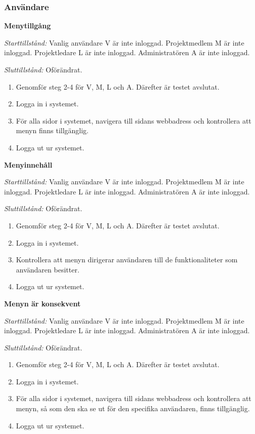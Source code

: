 \documentclass[a4paper]{article}
\begin{document}
\subsubsection{Användare}
\begin{FT}
\item \textbf{Menytillgång}

\emph{Starttillstånd:} Vanlig användare V är inte inloggad. Projektmedlem M är inte inloggad. Projektledare L är inte inloggad. Administratören A är inte inloggad.

\emph{Sluttillstånd:} Oförändrat.

\begin{enumerate}
\item Genomför steg 2-4 för V, M, L och A. Därefter är testet avslutat.
\item Logga in i systemet.
\item För alla sidor i systemet, navigera till sidans webbadress och kontrollera att menyn finns tillgänglig.
\item Logga ut ur systemet.
\end{enumerate}

\item \textbf{Menyinnehåll}

\emph{Starttillstånd:} Vanlig användare V är inte inloggad. Projektmedlem M är inte inloggad. Projektledare L är inte inloggad. Administratören A är inte inloggad.

\emph{Sluttillstånd:} Oförändrat.

\begin{enumerate}
\item Genomför steg 2-4 för V, M, L och A. Därefter är testet avslutat.
\item Logga in i systemet.
\item Kontrollera att menyn dirigerar användaren till de funktionaliteter som användaren besitter.
\item Logga ut ur systemet.
\end{enumerate}

\item \textbf{Menyn är konsekvent}

\emph{Starttillstånd:} Vanlig användare V är inte inloggad. Projektmedlem M är inte inloggad. Projektledare L är inte inloggad. Administratören A är inte inloggad.

\emph{Sluttillstånd:} Oförändrat.

\begin{enumerate}
\item Genomför steg 2-4 för V, M, L och A. Därefter är testet avslutat.
\item Logga in i systemet.
\item För alla sidor i systemet, navigera till sidans webbadress och kontrollera att menyn, så som den ska se ut för den specifika användaren, finns tillgänglig.
\item Logga ut ur systemet.
\end{enumerate}


\end{FT}
\end{document}
